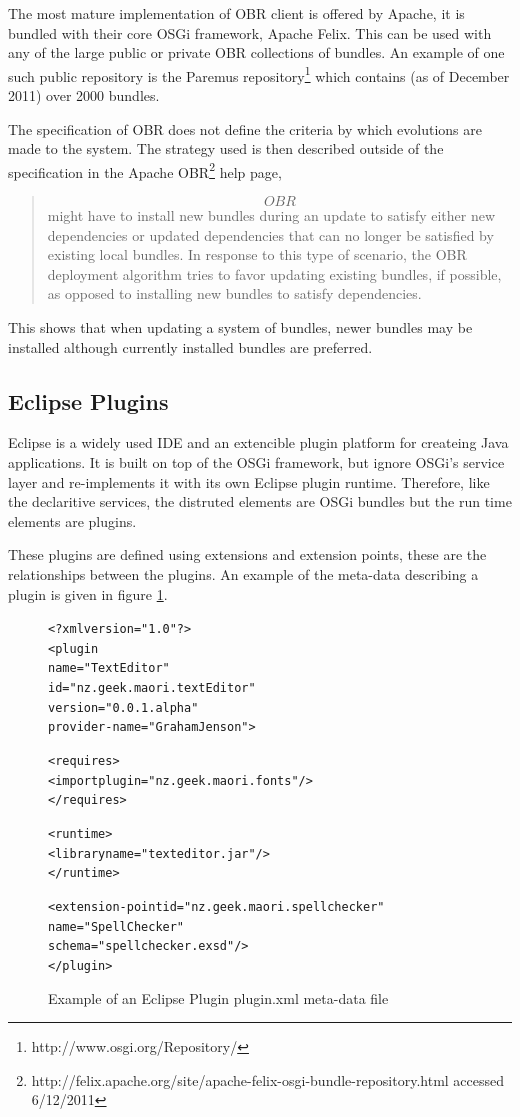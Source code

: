 The most mature implementation of OBR client is offered by Apache, it is bundled with their core OSGi framework, Apache Felix. 
This can be used with any of the large public or private OBR collections of bundles.
An example of one such public repository is the Paremus repository\footnote{http://www.osgi.org/Repository/} which contains (as of December 2011) over 2000 bundles.

The specification of OBR does not define the criteria by which evolutions are made to the system.
The strategy used is then described outside of the specification in the Apache OBR\footnote{http://felix.apache.org/site/apache-felix-osgi-bundle-repository.html accessed 6/12/2011} help page,

\begin{quotation}
\[OBR\] might have to install new bundles during an update to satisfy either new dependencies or updated dependencies that can no longer be satisfied by existing local bundles. 
In response to this type of scenario, the OBR deployment algorithm tries to favor updating existing bundles, if possible, as opposed to installing new bundles to satisfy dependencies.
\end{quotation}

This shows that when updating a system of bundles, newer bundles may be installed although currently installed bundles are preferred.

\subsection{Eclipse Plugins}
Eclipse is a widely used IDE and an extencible plugin platform for createing Java applications.
It is built on top of the OSGi framework, but ignore OSGi's service layer and re-implements it with its own Eclipse plugin runtime.
Therefore, like the declaritive services, the distruted elements are OSGi bundles but the run time elements are plugins.

These plugins are defined using extensions and extension points, these are the relationships between the plugins.
An example of the meta-data describing a plugin is given in figure \ref{eclipseplugin}. 

\begin{figure}[htp]
\begin{center}
\begin{alltt}
<?xml version="1.0"?>
<plugin
    name="Text Editor"
    id="nz.geek.maori.textEditor"
    version="0.0.1.alpha"
    provider-name="Graham Jenson">
    
    <requires>
        <import plugin="nz.geek.maori.fonts"/>
    </requires>

    <runtime>
        <library name="texteditor.jar"/>
    </runtime>
    
    <extension-point id="nz.geek.maori.spellchecker" 
        name="Spell Checker" 
        schema="spellchecker.exsd"/>
</plugin>
\end{alltt}
  \caption[Eclipse Plugin meta-data]{Example of an Eclipse Plugin plugin.xml meta-data file}
  \label{eclipseplugin}
\end{center}
\end{figure}

